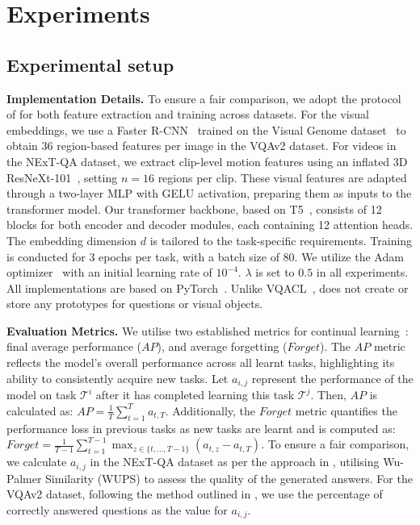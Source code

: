 \section{Experiments}
\label{sec:experiments}

\subsection{Experimental setup}
\noindent\textbf{Implementation Details. }To ensure a fair comparison, we adopt the protocol of \citep{zhang2023vqacl} for both feature extraction and training across datasets. For the visual embeddings, we use a Faster R-CNN~\citep{faster_rcnn} trained on the Visual Genome dataset~\citep{Krishna2016VisualGC} to obtain 36 region-based features per image in the VQAv2 dataset. For videos in the NExT-QA dataset, we extract clip-level motion features using an inflated 3D ResNeXt-101~\citep{hara3dcnns}, setting $n = 16$ regions per clip. These visual features are adapted through a two-layer MLP with GELU activation, preparing them as inputs to the transformer model. Our transformer backbone, based on T5~\citep{2020t5}, consists of 12 blocks for both encoder and decoder modules, each containing 12 attention heads. The embedding dimension $d$ is tailored to the task-specific requirements. Training is conducted for 3 epochs per task, with a batch size of 80. We utilize the Adam optimizer~\citep{KingBa15} with an initial learning rate of $10^{-4}$. $\lambda$ is set to $0.5$ in all experiments. All implementations are based on PyTorch~\citep{pytorch}. Unlike VQACL~\citep{zhang2023vqacl}, \qstmethodshort{} does not create or store any prototypes for questions or visual objects.


\noindent\textbf{Evaluation Metrics. }We utilise two established metrics for continual learning~\citep{zhang2023vqacl, Chaudhry_2018, lopezpaz2022gradientepisodicmemorycontinual}: final average performance ($AP$), and average forgetting ($Forget$). The $AP$ metric reflects the model's overall performance across all learnt tasks, highlighting its ability to consistently acquire new tasks. Let $a_{i,j}$ represent the performance of the model on task $\mathcal{T}^i$ after it has completed learning this task $\mathcal{T}^j$. Then, $AP$ is calculated as: $AP\!=\!\frac{1}{T} \sum_{t=1}^{T} a_{t,T}.$
Additionally, the $Forget$ metric quantifies the performance loss in previous tasks as new tasks are learnt and is computed as:
$Forget\!=\!\frac{1}{T-1} \sum_{t=1}^{T-1} \max_{z \in \{t, \ldots, T-1\}} (a_{t,z} - a_{t,T}).$ To ensure a fair comparison, we calculate $a_{i,j}$ in the NExT-QA dataset as per the approach in \citep{zhang2023vqacl, xiao2021next}, utilising Wu-Palmer Similarity (WUPS) \citep{wups} to assess the quality of the generated answers. For the VQAv2 dataset, following the method outlined in \citep{zhang2023vqacl}, we use the percentage of correctly answered questions as the value for $a_{i,j}$.

